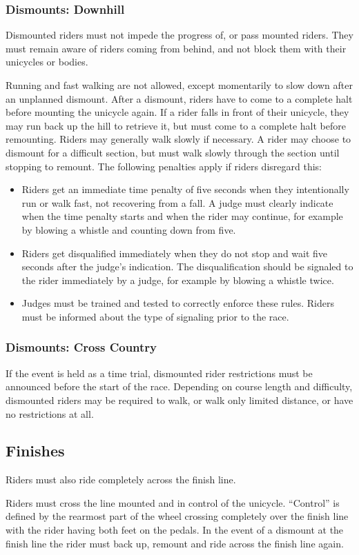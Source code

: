\subsubsection{Dismounts: Downhill}

Dismounted riders must not impede the progress of, or pass mounted riders.
They must remain aware of riders coming from behind, and not block them with their
unicycles or bodies.

Running and fast walking are not allowed, except momentarily to slow down after an unplanned dismount.
After a dismount, riders have to come to a complete halt before mounting the unicycle again.
If a rider falls in front of their unicycle, they may run back up the hill to retrieve it, but must come to a complete halt before remounting.
Riders may generally walk slowly if necessary.
A rider may choose to dismount for a difficult section, but must walk slowly through the section until stopping to remount.
The following penalties apply if riders disregard this:
\begin{itemize}
\item Riders get an immediate time penalty of five seconds when they intentionally run or walk fast, not recovering from a fall.
A judge must clearly indicate when the time penalty starts and when the rider may continue, for example by blowing a whistle and counting down from five.
\item Riders get disqualified immediately when they do not stop and wait five seconds after the judge's indication.
The disqualification should be signaled to the rider immediately by a judge, for example by blowing a whistle twice.
\item Judges must be trained and tested to correctly enforce these rules.
Riders must be informed about the type of signaling prior to the race.
\end{itemize}

\subsubsection{Dismounts: Cross Country}

If the event is held as a time trial, dismounted rider restrictions must be announced before the start of the race.
Depending on course length and difficulty, dismounted riders may be required to walk, or walk only limited distance, or have no restrictions at all.

\subsection{Finishes}

Riders must also ride completely across the finish line. 

Riders must cross the line mounted and in control of the unicycle.
``Control'' is defined by the rearmost part of the wheel crossing completely over the finish line with the rider having both feet on the pedals.
In the event of a dismount at the finish line the rider must back up, remount and ride across the finish line again.

